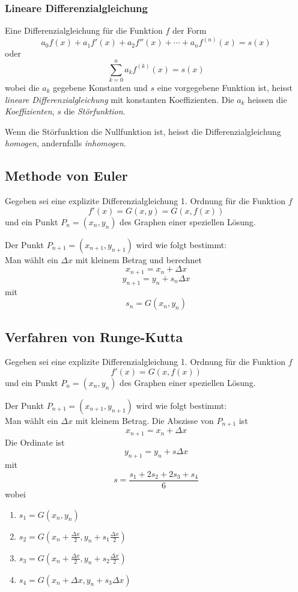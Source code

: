 \subsubsection{Lineare Differenzialgleichung}

Eine Differenzialgleichung für die Funktion $f$ der Form
$$a_0 f(x) + a_1 f'(x) + a_2 f''(x) + \dotsb + a_n f^{(n)}(x) = s(x)$$
oder
$$\sum\limits_{k=0}^n a_k f^{(k)}(x) = s(x)$$
wobei die $a_k$ gegebene Konstanten und $s$ eine vorgegebene Funktion ist,
heisst \emph{lineare Differenzialgleichung} mit konstanten Koeffizienten. Die
$a_k$ heissen die \emph{Koeffizienten}, $s$ die \emph{Störfunktion}.

Wenn die Störfunktion die Nullfunktion ist, heisst die Differenzialgleichung
\emph{homogen}, andernfalls \emph{inhomogen}.


\subsection{Methode von Euler}

Gegeben sei eine explizite Differenzialgleichung 1. Ordnung für die Funktion $f$
$$f'(x) = G(x, y) = G(x,f(x))$$
und ein Punkt $P_n = (x_n,y_n)$ des Graphen einer speziellen Lösung.

Der Punkt $P_{n+1} = (x_{n+1}, y_{n+1})$ wird wie folgt bestimmt:\\
Man wählt ein $\Delta{x}$ mit kleinem Betrag und berechnet
$$x_{n+1} = x_n + \Delta x$$
$$y_{n+1} = y_n + s_n\Delta x$$
mit
$$s_n = G(x_n,y_n)$$


\subsection{Verfahren von Runge-Kutta}

Gegeben sei eine explizite Differenzialgleichung 1. Ordnung für die Funktion $f$
$$f'(x) = G(x, f(x))$$
und ein Punkt $P_n = (x_n, y_n)$ des Graphen einer speziellen Lösung.

Der Punkt $P_{n+1} = (x_{n+1},y_{n+1})$ wird wie folgt bestimmt:\\
Man wählt ein $\Delta{x}$ mit kleinem Betrag. Die Abszisse von $P_{n+1}$ ist
$$x_{n+1} = x_n + \Delta x$$
Die Ordinate ist
$$y_{n+1} = y_n + s\Delta x$$
mit
$$s = \frac{s_1 + 2s_2 + 2s_3 + s_4}{6}$$
wobei
\begin{enumerate}
    \item $\displaystyle s_1 = G(x_n, y_n)$
    \item $\displaystyle s_2 = G\left(x_n + \frac{\Delta{x}}{2}, y_n + s_1
        \frac{\Delta x}{2}\right)$
    \item $\displaystyle s_3 = G\left(x_n + \frac{\Delta{x}}{2}, y_n + s_2
        \frac{\Delta x}{2}\right)$
    \item $\displaystyle s_4 = G(x_n+\Delta x, y_n+s_3\Delta x)$
\end{enumerate}


